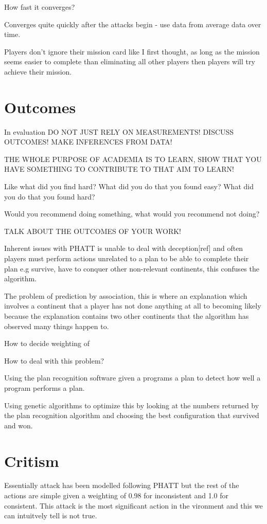 \documentclass[parskip]{cs4rep}
\begin{document}
How fast it converges?

Converges quite quickly after the attacks begin - use data from average data over time.

Players don't ignore their mission card like I first thought, as long as the mission seems easier to complete than eliminating all other players then players will try achieve their mission.

\section{Outcomes}

In evaluation DO NOT JUST RELY ON MEASUREMENTS! DISCUSS OUTCOMES! MAKE INFERENCES FROM DATA!

THE WHOLE PURPOSE OF ACADEMIA IS TO LEARN, SHOW THAT YOU HAVE SOMETHING TO CONTRIBUTE TO THAT AIM TO LEARN!

Like what did you find hard? What did you do that you found easy? What did you do that you found hard? 

Would you recommend doing something, what would you recommend not doing?

TALK ABOUT THE OUTCOMES OF YOUR WORK!

Inherent issues with PHATT is unable to deal with deception[ref] and often players must perform actions unrelated to a plan to be able to complete their plan e.g survive, have to conquer other non-relevant continents, this confuses the algorithm.

The problem of prediction by association, this is where an explanation which involves a continent that a player has not done anything at all to becoming likely because the explanation contains two other continents that the algorithm has observed many things happen to.

How to decide weighting of 

How to deal with this problem?

Using the plan recognition software given a programs a plan to detect how well a program performs a plan. 

Using genetic algorithms to optimize this by looking at the numbers returned by the plan recognition algorithm and choosing the best configuration that survived and won.

\section{Critism}

Essentially attack has been modelled following PHATT but the rest of the actions are simple given a weighting of 0.98 for inconsistent and 1.0 for consistent. This attack is the most significant action in the vironment and this we can intuitvely tell is not true.
\end{document}
